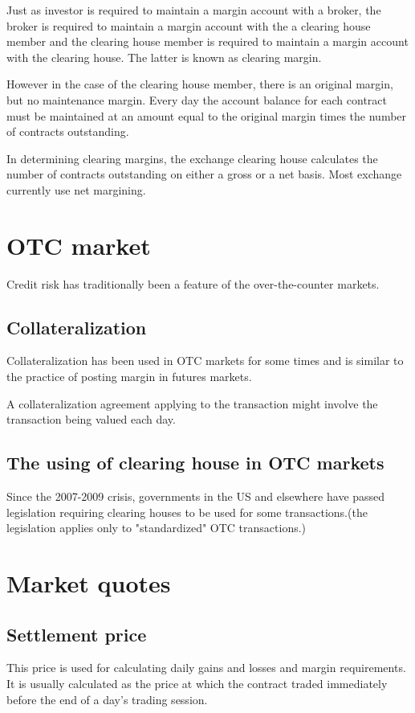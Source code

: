 \documentclass{article}
\begin{document}
Just as investor is required to maintain a margin account with a broker, the broker is required to maintain a margin account with the a clearing house member and the clearing house member is required to maintain a margin account with the clearing house. The latter is known as clearing margin.

However in the case of the clearing house member, there is an original margin, but no maintenance margin. Every day the  account balance for each contract must be maintained at an amount equal to the original margin times the number of contracts outstanding. 

In determining clearing margins, the exchange clearing house calculates the number of contracts outstanding on either a gross or a net basis. Most exchange currently use net margining.

\section{OTC market}
Credit risk has traditionally been a feature of the over-the-counter markets. 
\subsection{Collateralization }
Collateralization has been used in OTC markets for some times and is similar to the practice of posting margin in futures markets.

A collateralization agreement applying to the transaction might involve the transaction being valued each day.
\subsection{The using of clearing house in OTC markets}
Since the 2007-2009 crisis, governments in the US and elsewhere have passed legislation requiring clearing houses to be used for some transactions.(the legislation applies only to "standardized" OTC transactions.)

\section{Market quotes}
\subsection{Settlement price}
This price is used for calculating daily gains and losses and margin requirements. It is usually calculated as the price at which the contract traded immediately before the end of a day's trading session.
\end{document}
